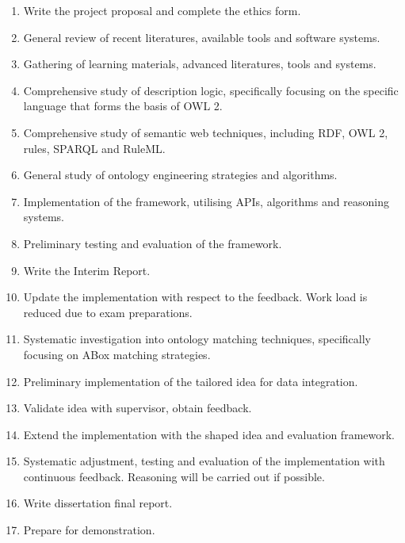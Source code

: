 \documentclass[a4paper,12pt,twoside]{article}
\begin{document}
\begin{enumerate}[itemsep=0.1em,label=\Alph*.]
	\item Write the project proposal and complete the ethics form.
	\item General review of recent literatures, available tools and software systems.
	\item Gathering of learning materials, advanced literatures, tools and systems.
	\item Comprehensive study of description logic, specifically focusing on the specific language that forms the basis of OWL 2.
	\item Comprehensive study of semantic web techniques, including RDF, OWL 2, rules, SPARQL and RuleML.
	\item General study of ontology engineering strategies and algorithms.
	\item Implementation of the framework, utilising APIs, algorithms and reasoning systems.
	\item Preliminary testing and evaluation of the framework.
	\item Write the Interim Report.
	\item Update the implementation with respect to the feedback. Work load is reduced due to exam preparations.
	\item Systematic investigation into ontology matching techniques, specifically focusing on ABox matching strategies.
	\item Preliminary implementation of the tailored idea for data integration.
	\item Validate idea with supervisor, obtain feedback.
	\item Extend the implementation with the shaped idea and evaluation framework.
	\item Systematic adjustment, testing and evaluation of the implementation with continuous feedback. Reasoning will be carried out if possible.
	\item Write dissertation final report.
	\item Prepare for demonstration.
\end{enumerate}







% 
\end{document}
